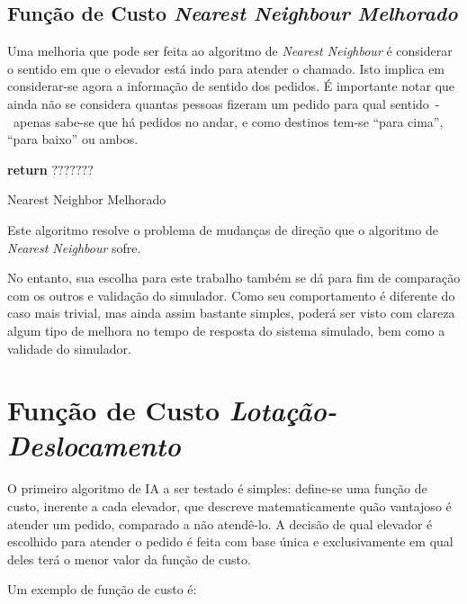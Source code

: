 
\subsection{\label{sec:ai:nnm}Função de Custo \textit{Nearest Neighbour
Melhorado}}

Uma melhoria que pode ser feita ao algoritmo de \textit{Nearest Neighbour}
é considerar o sentido em que o elevador está indo para atender o chamado. Isto
implica em considerar-se agora a informação de sentido dos pedidos. É importante
notar que ainda não se considera quantas pessoas fizeram um pedido para qual
sentido~-~apenas sabe-se que há pedidos no andar, e como destinos tem-se ``para
cima'', ``para baixo'' ou ambos.

\begin{algorithm}[htb]
\begin{center}
\begin{algorithmic}[1]
  \State \textbf{return} $???????$
\EndFunction
\end{algorithmic}
\end{center}
\caption
   {\label{alg:nnm}Nearest Neighbor Melhorado}
\end{algorithm}

Este algoritmo resolve o problema de mudanças de direção que o algoritmo de
\textit{Nearest Neighbour} sofre.

No entanto, sua escolha para este trabalho também se dá para fim de comparação
com os outros e validação do simulador. Como seu comportamento é diferente do
caso mais trivial, mas ainda assim bastante simples, poderá ser visto com clareza
algum tipo de melhora no tempo de resposta do sistema simulado, bem como a validade do simulador.

\section{\label{sec:ai:lotacao}Função de Custo \textit{Lotação-Deslocamento}}

O primeiro algoritmo de IA a ser testado é simples: define-se uma
função de custo, inerente a cada elevador, que descreve matematicamente quão
vantajoso é atender um pedido, comparado a não atendê-lo. A decisão de qual
elevador é escolhido para atender o pedido é feita com base única e
exclusivamente em qual deles terá o menor valor da função de custo.

Um exemplo de função de custo é:

